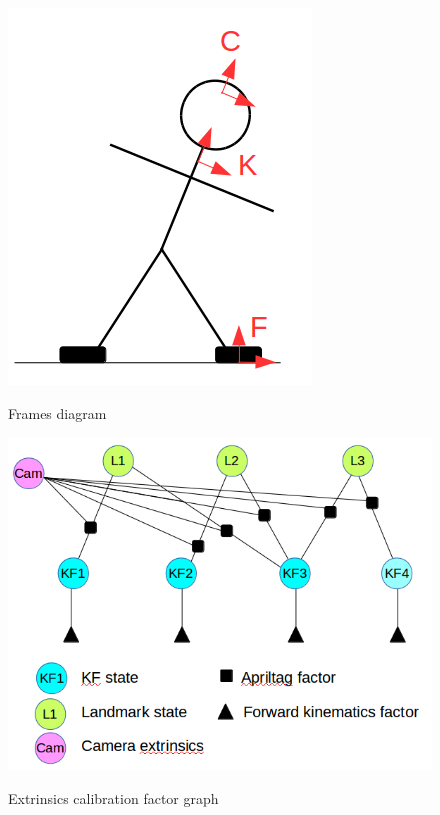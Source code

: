 \documentclass[11pt]{article}
\begin{document}
\begin{figure}[ht]
\begin{minipage}[c]{.46\linewidth}
    \centering
    \includegraphics[width=0.6\linewidth]{robot_sketch.png}
    \label{fig:sketch}
    \caption{Frames diagram}
\end{minipage} \hfill
\begin{minipage}[c]{.46\linewidth}
    \centering
    \includegraphics[width=\linewidth]{cam_extrinsics_factor_graph.png}
    \label{fig:factorgraph}
    \caption{Extrinsics calibration factor graph}
\end{minipage}
\end{figure}
\end{document}

